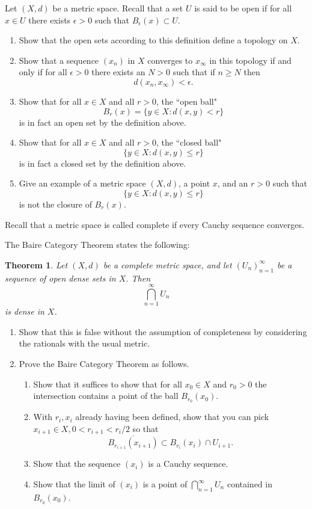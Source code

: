 \documentclass[12pt]{amsart}
\newtheorem{thm}{Theorem}[section]
\theoremstyle{definition}
\theoremstyle{remark}
\renewcommand{\bold}[1]{\medskip \noindent {\bf #1 }\nopagebreak}
\begin{document}
\bold{Problem A:} Let $(X,d)$ be a metric space. Recall that a set $U$ is said to be open if for all $x\in U$ there exists $\epsilon>0$ such that $B_\epsilon(x) \subset U$.
\begin{enumerate}
\item Show that the open sets according to this definition define a topology on $X$. 
\item Show that a sequence $(x_n)$ in $X$ converges to $x_\infty$ in  this topology if and only if for all $\epsilon>0$ there exists an $N>0$ such that if $n\geq N$ then 
$$d(x_n, x_\infty)<\epsilon.$$
\item Show that  for all $x\in X$ and all $r>0$, the ``open ball"
$$B_r(x) = \{ y \in X : d(x,y)<r\}$$
is in fact an open set by the definition above. 
\item Show that  for all $x\in X$ and all $r>0$, the ``closed ball"
$$ \{ y \in X : d(x,y)\leq r\}$$
is in fact a closed set by the definition above. 
\item Give an example of a metric space $(X,d)$, a point $x$, and an $r>0$ such that 
$$\{ y \in X : d(x,y)\leq r\}$$
is not the closure of $B_r(x)$. 
\end{enumerate}

\bold{Problem B:} Recall that a metric space is called complete if every Cauchy sequence converges. 

The Baire Category Theorem states the following: 

\begin{thm}
Let $(X,d)$ be a complete metric space, and let $(U_n)_{n=1}^\infty$ be a sequence of open dense sets in $X$. Then 
$$\bigcap_{n=1}^\infty U_n$$
is dense in $X$. 
\end{thm}

\begin{enumerate}
\item Show that this is false without the assumption of completeness by considering the rationals with the usual metric. 
\item Prove the Baire Category Theorem as follows. 
\begin{enumerate} 
\item Show that it suffices to show that for all $x_0\in X$ and $r_0>0$ the intersection contains a point of the ball $B_{r_0}(x_0)$. 
\item With $r_i, x_i$ already having been defined, show that you can pick $x_{i+1} \in X, 0< r_{i+1}< r_i/2$ so that 
$$\overline{B_{r_{i+1}} (x_{i+1})} \subset B_{r_i}(x_i) \cap U_{i+1}.$$
\item Show that the sequence $(x_i)$ is a Cauchy sequence. 
\item Show that the limit of $(x_i)$ is a point of $\bigcap_{n=1}^\infty U_n$ contained in $B_{r_0}(x_0)$.
\end{enumerate}
\end{enumerate}
\end{document}
